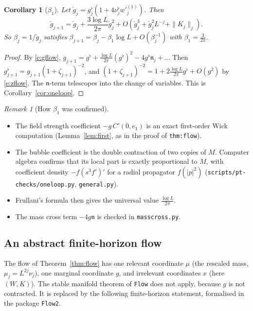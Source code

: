 \documentclass[11pt]{amsart}
\newtheorem{corollary}[theorem]{Corollary}
\theoremstyle{definition}
\theoremstyle{remark}
\newtheorem{remark}[theorem]{Remark}
\numberwithin{equation}{section}
\begin{document}
\begin{corollary}[$\beta_1$]\label{cor:beta1}
Let $\check g_j=g^\flat_j(1+4\nu^\flat_jw'^{(1)}_j)$. Then
\[
  \check g_{j+1}=\check g_j+\frac{3\log L}{2\pi}\check g_j^2+O(\check g_j^3+\check g_j^2L^{-j}+\|K_j\|_j).
\]
So $\beta_j=1/\check g_j$ satisfies $\beta_{j+1}=\beta_j-\beta_1\log L+O(\beta_j^{-1})$ with
$\beta_1=\frac3{2\pi}$.
\end{corollary}

\begin{proof}
By \eqref{e:gflow}, $g_{j+1}=g^\flat+\frac{\log L}{2\pi}(g^\flat)^2-4g^\flat\mathfrak n_j+\dots$
Then $g^\flat_{j+1}=g_{j+1}(1+\zeta_{j+1})^{-2}$, and
$(1+\zeta_{j+1})^{-2}=1+2\frac{\log L}{2\pi}g^\flat+O(g^2)$ by \eqref{e:zflow}. The
$\mathfrak n$-term telescopes into the change of variables. This is Corollary~\ref{cor:oneloop}.
\end{proof}

\begin{remark}[How $\beta_1$ was confirmed]
\begin{itemize}
\item The field strength coefficient $-g\,C'(0,e_1)$ is an exact first-order Wick computation
  (Lemma~\ref{lem:first}, as in the proof of \texttt{thm:flow}).
\item The bubble coefficient is the double contraction of two copies of $M$. Computer algebra
  confirms that its local part is exactly proportional to $M$, with coefficient density
  $-f(s^3f')'$ for a radial propagator $f(|p|^2)$
  (\texttt{scripts/pt-checks/oneloop.py}, \texttt{general.py}).
\item Frullani's formula then gives the universal value $\frac{\log L}{2\pi}$.
\item The mass cross term $-4g\mathfrak n$ is checked in \texttt{masscross.py}.
\end{itemize}
\end{remark}

\subsection{An abstract finite-horizon flow}
\label{sec:fh-flow}
The flow of Theorem~\ref{thm:flow} has one relevant coordinate $\mu$ (the rescaled
mass, $\mu_j=L^{2j}\nu_j$), one marginal coordinate $g$, and irrelevant coordinates $x$ (here
$(W,K)$). The stable manifold theorem of \texttt{Flow} does not apply, because $g$ is not
contracted. It is replaced by the following finite-horizon statement, formalised in the package
\texttt{Flow2}.
\end{document}
